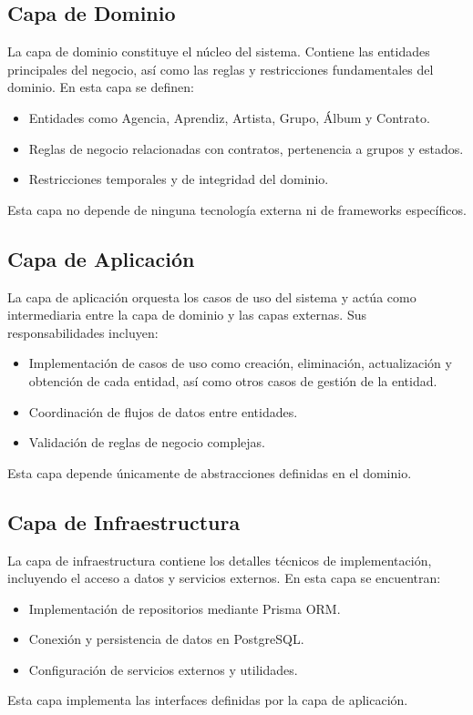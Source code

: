 \documentclass[12pt,a4paper,spanish,oneside]{report}
\begin{document}
\subsection{Capa de Dominio}
La capa de dominio constituye el núcleo del sistema. Contiene las entidades principales
del negocio, así como las reglas y restricciones fundamentales del dominio.
En esta capa se definen:
\begin{itemize}
    \item Entidades como Agencia, Aprendiz, Artista, Grupo, Álbum y Contrato.
    \item Reglas de negocio relacionadas con contratos, pertenencia a grupos y estados.
    \item Restricciones temporales y de integridad del dominio.
\end{itemize}
Esta capa no depende de ninguna tecnología externa ni de frameworks específicos.

\subsection{Capa de Aplicación}
La capa de aplicación orquesta los casos de uso del sistema y actúa como intermediaria
entre la capa de dominio y las capas externas. Sus responsabilidades incluyen:
\begin{itemize}
    \item Implementación de casos de uso como creación, eliminación, actualización y obtención de cada entidad, así como otros casos de gestión de la entidad.
    \item Coordinación de flujos de datos entre entidades.
    \item Validación de reglas de negocio complejas.
\end{itemize}
Esta capa depende únicamente de abstracciones definidas en el dominio.

\subsection{Capa de Infraestructura}
La capa de infraestructura contiene los detalles técnicos de implementación, incluyendo el acceso a datos y servicios externos. En esta capa se encuentran:
\begin{itemize}
    \item Implementación de repositorios mediante Prisma ORM.
    \item Conexión y persistencia de datos en PostgreSQL.
    \item Configuración de servicios externos y utilidades.
\end{itemize}
Esta capa implementa las interfaces definidas por la capa de aplicación.
\end{document}

